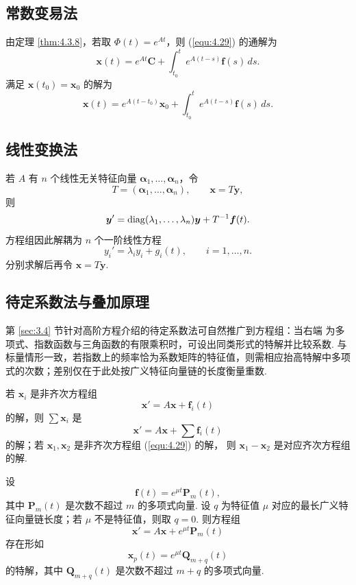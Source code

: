 \subsection{常数变易法}

由定理 \ref{thm:4.3.8}，若取 $\Phi(t)=e^{At}$，则
(\ref{equ:4.29}) 的通解为
\begin{equation}\label{equ:4.30}
\bm{x}(t)
=e^{At}\bm{C}
+\int_{t_0}^{t}e^{A(t-s)}\bm{f}(s)\,ds.
\end{equation}
满足 $\bm{x}(t_0)=\bm{x}_0$ 的解为
\begin{equation}\label{equ:4.31}
\bm{x}(t)
=e^{A(t-t_0)}\bm{x}_0
+\int_{t_0}^{t}e^{A(t-s)}\bm{f}(s)\,ds.
\end{equation}

\subsection{线性变换法}

若 $A$ 有 $n$ 个线性无关特征向量
$\bm{\alpha}_1,\ldots,\bm{\alpha}_n$，令
\[
T=(\bm{\alpha}_1,\ldots,\bm{\alpha}_n),
\qquad \bm{x}=T\bm{y},
\]
则
\begin{equation}\label{equ:4.32}
\bm{y}'
=\operatorname{diag}(\lambda_1,\ldots,\lambda_n)\bm{y}
+T^{-1}\bm{f}(t).
\end{equation}
方程组因此解耦为 $n$ 个一阶线性方程
\begin{equation}\label{equ:4.33}
y_i'=\lambda_iy_i+g_i(t),\qquad i=1,\ldots,n.
\end{equation}
分别求解后再令 $\bm{x}=T\bm{y}$.

\subsection{待定系数法与叠加原理}

第 \ref{sec:3.4} 节针对高阶方程介绍的待定系数法可自然推广到方程组：当右端
为多项式、指数函数与三角函数的有限乘积时，可设出同类形式的特解并比较系数.
与标量情形一致，若指数上的频率恰为系数矩阵的特征值，则需相应抬高特解中多项
式的次数；差别仅在于此处按广义特征向量链的长度衡量重数.

\begin{thm}[(叠加原理)]\label{thm:4.5.1}
若 $\bm{x}_i$ 是非齐次方程组
\[
\bm{x}'=A\bm{x}+\bm{f}_i(t)
\]
的解，则 $\sum\bm{x}_i$ 是
\[
\bm{x}'=A\bm{x}+\sum\bm{f}_i(t)
\]
的解；若 $\bm{x}_1,\bm{x}_2$ 是非齐次方程组 (\ref{equ:4.29}) 的解，
则 $\bm{x}_1-\bm{x}_2$ 是对应齐次方程组的解.
\end{thm}

\begin{thm}\label{thm:4.5.2}
设
\[
\bm{f}(t)=e^{\mu t}\bm{P}_m(t),
\]
其中 $\bm{P}_m(t)$ 是次数不超过 $m$ 的多项式向量. 设 $q$ 为特征值
$\mu$ 对应的最长广义特征向量链长度；若 $\mu$ 不是特征值，则取 $q=0$.
则方程组
\[
\bm{x}'=A\bm{x}+e^{\mu t}\bm{P}_m(t)
\]
存在形如
\begin{equation}\label{equ:4.34}
\bm{x}_p(t)=e^{\mu t}\bm{Q}_{m+q}(t)
\end{equation}
的特解，其中 $\bm{Q}_{m+q}(t)$ 是次数不超过 $m+q$ 的多项式向量.
\end{thm}

